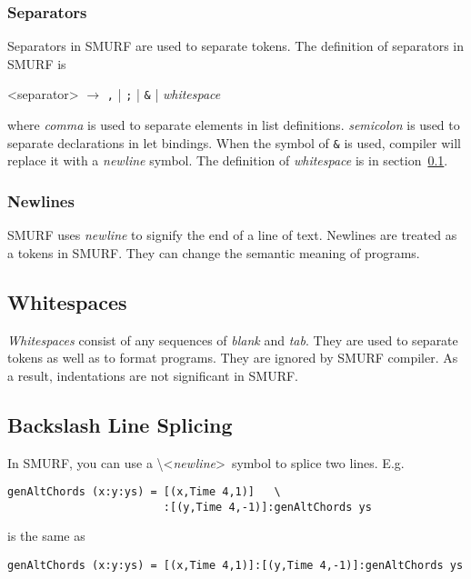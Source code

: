 \subsubsection{Separators}
Separators in SMURF are used to separate tokens. The definition of separators in
SMURF is 

\begin{grammar}
<separator> $\rightarrow$ \texttt{,} | \texttt{;} | \texttt{\&} | \it{whitespace}
\end{grammar}

where {\it comma} is used to separate elements in list definitions.
{\it semicolon} is used to separate declarations in let bindings. 
When the symbol of \texttt{\&} is used, compiler will replace it with a {\it newline} symbol.
The definition of {\it whitespace} is in section~\ref{sec:whitespaces}. 


\subsubsection{Newlines}
SMURF uses {\it newline} to signify the end of a line of text. Newlines
are treated as a tokens in SMURF. They can change the semantic meaning of programs.


\subsection{Whitespaces}
\label{sec:whitespaces}
{\it Whitespaces} consist of any sequences of {\it blank} and {\it tab}.
They are used to
separate tokens as well as to format programs. They are ignored by
SMURF compiler. As a result, indentations are not significant in SMURF.


\subsection{Backslash Line Splicing}
In SMURF, you can use a \textbackslash\textless{\it newline}\textgreater~symbol to splice two lines. E.g.
\begin{lstlisting}
genAltChords (x:y:ys) = [(x,Time 4,1)]   \
                        :[(y,Time 4,-1)]:genAltChords ys
\end{lstlisting}
is the same as 
\begin{lstlisting}
genAltChords (x:y:ys) = [(x,Time 4,1)]:[(y,Time 4,-1)]:genAltChords ys
\end{lstlisting}
